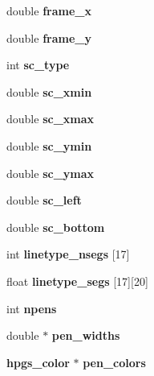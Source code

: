\begin{Indent}{\bf }\par
\begin{CompactItemize}
\item 
double {\bf frame\_\-x}
\item 
double \textbf{frame\_\-y}\label{structhpgs__reader__st_c2f19dbd790611b87ec699f6eaa9b204}

\end{CompactItemize}
\end{Indent}
\begin{Indent}{\bf }\par
\begin{CompactItemize}
\item 
int {\bf sc\_\-type}
\item 
double \textbf{sc\_\-xmin}\label{structhpgs__reader__st_5a40f76e90895fc2b756a89c8f62714d}

\item 
double \textbf{sc\_\-xmax}\label{structhpgs__reader__st_9ae55a23410d686c96bb465f8aa80f7a}

\item 
double \textbf{sc\_\-ymin}\label{structhpgs__reader__st_cbf694476f0996aab26245dc6a4dcd24}

\item 
double \textbf{sc\_\-ymax}\label{structhpgs__reader__st_250631be90f5274ff935119a93aaccbb}

\item 
double \textbf{sc\_\-left}\label{structhpgs__reader__st_f245a6e2a76afe8085d30eea8499217b}

\item 
double \textbf{sc\_\-bottom}\label{structhpgs__reader__st_462644489e395b43ca0c37e8bdb3a392}

\end{CompactItemize}
\end{Indent}
\begin{Indent}{\bf }\par
\begin{CompactItemize}
\item 
int {\bf linetype\_\-nsegs} [17]
\item 
float \textbf{linetype\_\-segs} [17][20]\label{structhpgs__reader__st_d772d590b70c7411001cbb255f3e6db4}

\end{CompactItemize}
\end{Indent}
\begin{Indent}{\bf }\par
\begin{CompactItemize}
\item 
int {\bf npens}
\item 
double $\ast$ \textbf{pen\_\-widths}\label{structhpgs__reader__st_41eff30329ceb411108cc8a621043c76}

\item 
{\bf hpgs\_\-color} $\ast$ \textbf{pen\_\-colors}\label{structhpgs__reader__st_81f41ebedb2bf9171fd0a01168d5bdc6}

\end{CompactItemize}
\end{Indent}
